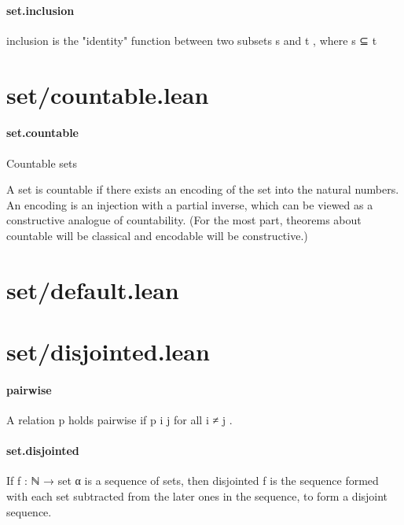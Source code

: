\documentclass{article}
\begin{document}
\paragraph{set.inclusion}
\par
\colorbox[RGB]{253,246,227}{{{{\color[RGB]{101, 123, 131} inclusion }}}} is the "identity" function between two subsets 
\colorbox[RGB]{253,246,227}{{{{\color[RGB]{101, 123, 131} s }}}} and 
\colorbox[RGB]{253,246,227}{{{{\color[RGB]{101, 123, 131} t }}}}, where 
\colorbox[RGB]{253,246,227}{{{{\color[RGB]{101, 123, 131} s ⊆ t }}}}\section{set/countable.lean}\paragraph{set.countable}
\par
Countable sets
\par
A set is countable if there exists an encoding of the set into the natural numbers.
An encoding is an injection with a partial inverse, which can be viewed as a
constructive analogue of countability. (For the most part, theorems about
\colorbox[RGB]{253,246,227}{{{{\color[RGB]{101, 123, 131} countable }}}} will be classical and 
\colorbox[RGB]{253,246,227}{{{{\color[RGB]{101, 123, 131} encodable }}}} will be constructive.)
\section{set/default.lean}\section{set/disjointed.lean}\paragraph{pairwise}
\par
A relation 
\colorbox[RGB]{253,246,227}{{{{\color[RGB]{101, 123, 131} p }}}} holds pairwise if 
\colorbox[RGB]{253,246,227}{{{{\color[RGB]{101, 123, 131} p i j }}}} for all 
\colorbox[RGB]{253,246,227}{{{{\color[RGB]{101, 123, 131} i  }}}{{{\color[RGB]{181, 137, 0} ≠ }}}{{{\color[RGB]{101, 123, 131}  j }}}}.
\paragraph{set.disjointed}
\par
If 
\colorbox[RGB]{253,246,227}{{{{\color[RGB]{101, 123, 131} f : ℕ  }}}{{{\color[RGB]{133, 153, 0} → }}}{{{\color[RGB]{101, 123, 131}  set α }}}} is a sequence of sets, then 
\colorbox[RGB]{253,246,227}{{{{\color[RGB]{101, 123, 131} disjointed f }}}} is
the sequence formed with each set subtracted from the later ones
in the sequence, to form a disjoint sequence.
\end{document}
